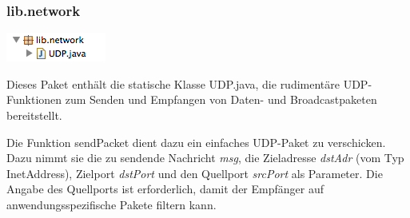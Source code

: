 \documentclass[a4paper,14pt,headsepline]{scrartcl}
\begin{document}
\begin{figure}[h]
\begin{center}
\end{center}
\end{figure}

\newpage

\subsubsection*{lib.network}

\includegraphics[width=0.17 \paperwidth]{./bilder/lib_network.png}

Dieses Paket enthält die statische Klasse UDP.java, die rudimentäre UDP-Funktionen zum Senden und Empfangen von Daten- und Broadcastpaketen bereitstellt. 

Die Funktion sendPacket dient dazu ein einfaches UDP-Paket zu verschicken. Dazu nimmt sie die zu sendende Nachricht \textit{msg}, die Zieladresse \textit{dstAdr} (vom Typ InetAddress), Zielport \textit{dstPort} und den Quellport \textit{srcPort} als Parameter. Die Angabe des Quellports ist erforderlich, damit der Empfänger auf anwendungsspezifische Pakete filtern kann.
\end{document}
